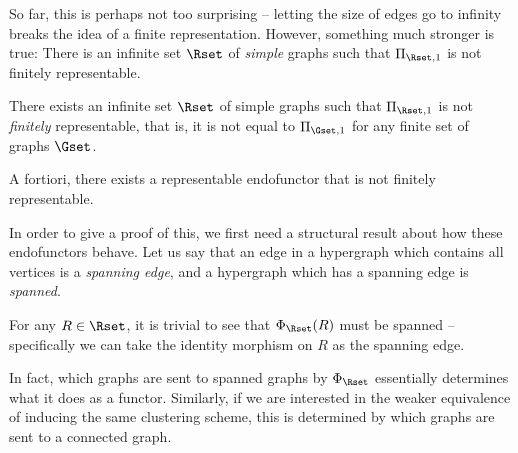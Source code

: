 \documentclass[a4paper,reqno,oneside]{article} %
\begin{document}
So far, this is perhaps not too surprising -- letting the size of edges go to infinity breaks the idea of a finite representation. However, something much stronger is true: There is an infinite set $\Rset$ of \emph{simple} graphs such that $\Pi_{\Rset,1}$ is not finitely representable.

\begin{theorem} \label{theorem_exists_not_finitely_representable}
    There exists an infinite set $\Rset$ of simple graphs such that $\Pi_{\Rset,1}$ is not \emph{finitely} representable, that is, it is not equal to $\Pi_{\Gset,1}$ for any finite set of graphs $\Gset$.

    A fortiori, there exists a representable endofunctor that is not finitely representable.
\end{theorem}

In order to give a proof of this, we first need a structural result about how these endofunctors behave. Let us say that an edge in a hypergraph which contains all vertices is a \emph{spanning edge}, and a hypergraph which has a spanning edge is \emph{spanned}.

\begin{remark}\label{remark_omegas_sent_to_cliques}
    For any $R \in \Rset$, it is trivial to see that $\Phi_\Rset(R)$ must be spanned -- specifically we can take the identity morphism on $R$ as the spanning edge.
\end{remark}

In fact, which graphs are sent to spanned graphs by $\Phi_\Rset$ essentially determines what it does as a functor. Similarly, if we are interested in the weaker equivalence of inducing the same clustering scheme, this is determined by which graphs are sent to a connected graph.
\end{document}
